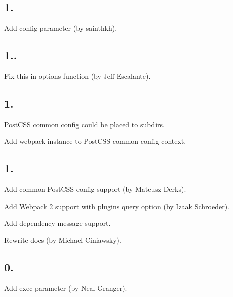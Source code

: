 \subsection*{1.}


\begin{DoxyItemize}
\item Add {\ttfamily config} parameter (by sainthkh).
\end{DoxyItemize}

\subsection*{1..}


\begin{DoxyItemize}
\item Fix {\ttfamily this} in options function (by Jeff Escalante).
\end{DoxyItemize}

\subsection*{1.}


\begin{DoxyItemize}
\item Post\+C\+SS common config could be placed to subdirs.
\item Add webpack instance to Post\+C\+SS common config context.
\end{DoxyItemize}

\subsection*{1.}


\begin{DoxyItemize}
\item Add common Post\+C\+SS config support (by Mateusz Derks).
\item Add Webpack 2 support with {\ttfamily plugins} query option (by Izaak Schroeder).
\item Add {\ttfamily dependency} message support.
\item Rewrite docs (by Michael Ciniawsky).
\end{DoxyItemize}

\subsection*{0.}


\begin{DoxyItemize}
\item Add {\ttfamily exec} parameter (by Neal Granger).
\end{DoxyItemize}

